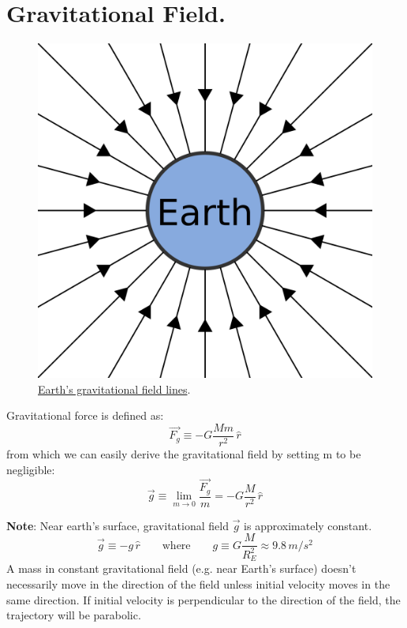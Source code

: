 \documentclass[11pt, letterpaper]{article}
\begin{document}
\section{Gravitational Field.}

		\begin{figure}[h!]
			\centering
			\includegraphics[scale=0.03]{gravitational-field}
			\caption{\href{https://www.tes.com/lessons/Z-xymdzS_E4_uQ/g484-chapter-4-
			gravitational-fields}{Earth's gravitational field lines}.}
			\label{fig:gravity}
		\end{figure}
		
		Gravitational force is defined as:
		\begin{equation}\label{eqn:gravi-force}
			\boxed{\vec{F_g} \equiv -G\frac{Mm}{r^2}\,\hat{r}}
		\end{equation}
		from which we can easily derive the gravitational field by setting m to be 
		negligible:
		\begin{equation}\label{eqn:gravi-field}		
			\boxed{\vec{g} \equiv \displaystyle\lim_{m \to 0} \frac{\vec{F_g}}{m} = 
			-G\frac{M}{r^2}\,\hat{r}}
		\end{equation}
		
		\noindent\textbf{Note}: Near earth's surface, gravitational field $\vec{g}$ is approximately
		constant.
				\[\vec{g} \equiv -g\,\hat{r} \qquad \text{where} \qquad g \equiv G\frac{M}{R_E^2}\approx
				9.8\,m/s^2\]
		 A mass in constant gravitational field (e.g. near Earth's surface) doesn't
		necessarily move in the direction of the field unless initial velocity moves in the same
		direction. If initial velocity is perpendicular to the direction of the field, the trajectory will 
		be parabolic.
\end{document}
